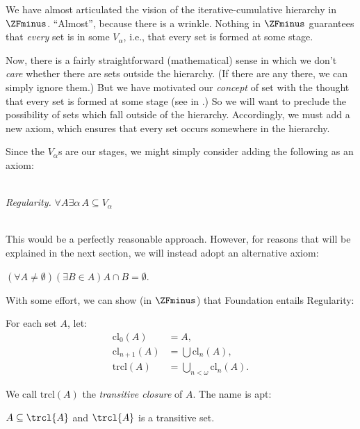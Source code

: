 \documentclass[../../../include/open-logic-section]{subfiles}
\begin{document}


We have almost articulated the vision of the iterative-cumulative
hierarchy in~$\ZFminus$. ``Almost'', because there is a wrinkle. Nothing in
$\ZFminus$ guarantees that \emph{every} set is in some $V_\alpha$,
i.e., that every set is formed at some stage. 

Now, there is a fairly straightforward (mathematical) sense in which
we don't \emph{care} whether there are sets outside the hierarchy. (If
there are any there, we can simply ignore them.) But we have motivated
our \emph{concept} of set with the thought that every set is formed at
some stage (see \stageshier{} in .) So
we will want to preclude the possibility of sets which fall outside of
the hierarchy. Accordingly, we must add a new axiom, which ensures
that every set occurs somewhere in the hierarchy. 

Since the $V_\alpha$s are our stages, we might simply consider adding
the following as an axiom:

\
\\\emph{Regularity.} $\forall A \exists \alpha\, A \subseteq V_\alpha$

\ \\This would be a perfectly reasonable approach. However, for reasons that will be
explained in the next section, we will instead adopt an alternative
axiom:

\begin{axiom}[Foundation]
$(\forall A \neq \emptyset)(\exists B \in A)A \cap B = \emptyset$.
\end{axiom}

With some effort, we can show (in $\ZFminus$) that Foundation entails Regularity:
\begin{defn}
For each set $A$, let:
\begin{align*}
	\text{cl}_0(A) &= A,\\
	\text{cl}_{n+1}(A) &= \bigcup \text{cl}_n(A),\\
	\text{trcl}(A) &= \bigcup_{n < \omega} \text{cl}_{n}(A).
\end{align*}
\end{defn}

We call $\text{trcl}(A)$ the \emph{transitive closure} of $A$. The name is apt:

\begin{prop}
$A \subseteq \trcl{A}$ and $\trcl{A}$ is a transitive set. 
\end{prop}
\end{document}
